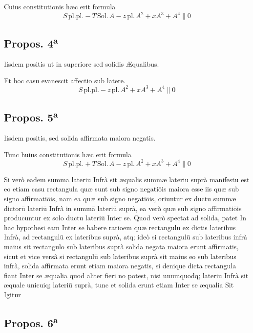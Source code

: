 \documentclass[11pt,a4paper]{article}
\begin{document}
Cuius constitutionis hæc erit formula
\[ S\,\mathrm{pl.pl.} - T\,\mathrm{Sol.}\,A - z\,\mathrm{pl.}\,A^{2} + xA^{3} + A^{4} \parallel 0 \]


\subsection*{Propos. 4\textsuperscript{a}}

Iisdem positis ut in superiore sed solidis Æqualibus.

Et hoc casu evanescit affectio sub latere.
\[ S\,\mathrm{pl.pl.} - z\,\mathrm{pl.}\,A^{2} + xA^{3} + A^{4} \parallel 0 \]

\subsection*{Propos. 5\textsuperscript{a}}

Iisdem positis, sed solida affirmata maiora negatis.

Tunc huius constitutionis hæc erit formula
\[ S\,\mathrm{pl.pl.} + T\,\mathrm{Sol.}\,A - z\,\mathrm{pl.}\,A^{2} + xA^{3} + A^{4} \parallel 0 \]

Si verò eadem summa lateriū Infrà sit æqualis summæ lateriū suprà manifestū est eo etiam casu rectangula quæ sunt sub signo negatiōis maiora esse iis quæ sub signo affirmatiōis, nam ea quæ sub signo negatiōis, oriuntur ex ductu summæ dictorū lateriū Infrà in summā lateriū suprà, ea verò quæ sub signo affirmatiōis producuntur ex solo ductu lateriū Inter se. Quod verò spectat ad solida, patet In hac hypothesi eam Inter se habere ratiōem quæ rectangulū ex dictis lateribus Infrà, ad rectangulū ex lateribus suprà, atq; ideò si rectangulū sub lateribus infrà maius sit rectangulo sub lateribus suprà solida negata maiora erunt affirmatis, sicut et vice versâ si rectangulū sub lateribus suprà sit maius eo sub lateribus infrà, solida affirmata erunt etiam maiora negatis, si denique dicta rectangula fiant Inter se æqualia quod aliter fieri nō potest, nisi unumquodq; lateriū Infrà sit æquale unicuiq; lateriū suprà, tunc et solida erunt etiam Inter se æqualia Sit Igitur

\subsection*{Propos. 6\textsuperscript{a}}
\end{document}
